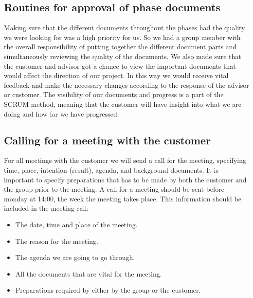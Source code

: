 \subsection{Routines for approval of phase documents}
Making sure that the different documents throughout the phases had the quality we were looking for was a high priority for us. So we had a group member with the overall responsibility of putting together the different document parts and simultaneously reviewing the quality of the documents.
\newline
\newline 
We also made sure that the customer and advisor got a chance to view the important documents that would affect the direction of our project. In this way we would receive vital feedback and make the necessary changes according to the response of the advisor or customer. 
\newline
\newline
The visibility of our documents and progress is a part of the SCRUM method, meaning that the customer will have insight into what we are doing and how far we have progressed.   

\subsection{Calling for a meeting with the customer}
For all meetings with the customer we will send a call for the meeting, specifying time, place, intention (result), agenda, and background documents. It is important to specify preparations that has to be made by both the customer and the group prior to the meeting.
\newline
\newline
A call for a meeting should be sent before monday at 14:00, the week the meeting takes place.
\newline
\newline
This information should be included in the meeting call:
\begin{itemize}
\item{}The date, time and place of the meeting.
\item{}The reason for the meeting.
\item{}The agenda we are going to go through.
\item{}All the documents that are vital for the meeting.
\item{}Preparations required by either by the group or the customer.
\end{itemize}

